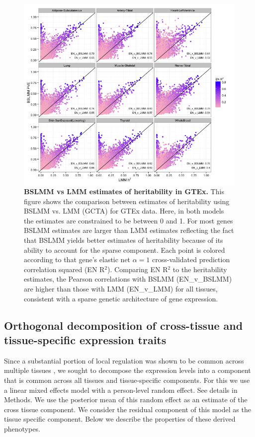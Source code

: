 \documentclass[10pt,letterpaper]{article}
\begin{document}
\begin{figure}[H]
\includegraphics[width=12cm]{Figures/Fig-GTEx_TW_PVE_v_h2.png}
\caption{{\bf BSLMM vs LMM estimates of heritability in GTEx.} 
This figure shows the comparison between estimates of heritability using BSLMM vs. LMM (GCTA) for GTEx data. Here, in both models the estimates are constrained to be between 0 and 1. For most genes BSLMM estimates are larger than LMM estimates reflecting the fact that BSLMM yields better estimates of heritability because of its ability to account for the sparse component. Each point is colored according to that gene's elastic net \(\alpha=1\) cross-validated prediction correlation squared (EN R$^2$). Comparing EN R$^2$ to the heritability estimates, the Pearson correlations with BSLMM (EN\_v\_BSLMM) are higher than those with LMM (EN\_v\_LMM) for all tissues, consistent with a sparse genetic architecture of gene expression.}
\label{fig-gtex-pve-h2}
\end{figure}

\subsection*{Orthogonal decomposition of cross-tissue and tissue-specific expression traits}

Since a substantial portion of local regulation was shown to be common across multiple tissues \cite{Ardlie_2015}, we sought to decompose the expression levels into a component that is common across all tissues and tissue-specific components. For this we use a linear mixed effects model with a person-level random effect. See details in Methods. We use the posterior mean of this random effect as an estimate of the cross tissue component. We consider the residual component of this model as the tissue specific component. Below we describe the properties of these derived phenotypes.
\end{document}
